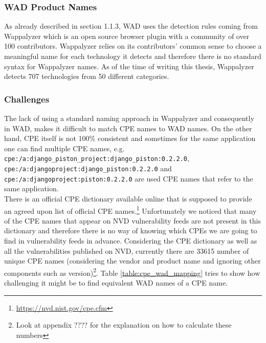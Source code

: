 \subsubsection{WAD Product Names}
As already described in section 1.1.3, WAD uses the detection rules coming from Wappalyzer which is an open source browser plugin with a community of over 100 contributors. Wappalyzer relies on its contributors' common sense to choose a meaningful name for each technology it detects and therefore there is no standard syntax for Wappalyzer names. As of the time of writing this thesis, Wappalyzer detects 707 technologies from 50 different categories.


\subsubsection{Challenges}
The lack of using a standard naming approach in Wappalyzer and consequently in WAD, makes it difficult to match CPE names to WAD names. On the other hand, CPE itself is not 100\% consistent and sometimes for the same application one can find multiple CPE names, e.g. \texttt{cpe:/a:django\_piston\_project:django\_piston:0.2.2.0}, \texttt{cpe:/a:djangoproject:django\_piston:0.2.2.0} and \texttt{cpe:/a:djangoproject:piston:0.2.2.0} are used CPE names that refer to the same application.
\\
There is an official CPE dictionary available online that is supposed to provide an agreed upon list of official CPE names.\footnote{\url{https://nvd.nist.gov/cpe.cfm}} Unfortunately we noticed that many of the CPE names that appear on NVD vulnerability feeds are not present in this dictionary and therefore there is no way of knowing which CPEs we are going to find in vulnerability feeds in advance. Considering the CPE dictionary as well as all the vulnerabilities published on NVD, currently there are 33615 number of unique CPE names (considering the vendor and product name and ignoring other components such as version)\footnote{Look at appendix ???? for the explanation on how to calculate these numbers}. Table \ref{table:cpe_wad_mapping} tries to show how challenging it might be to find equivalent WAD names of a CPE name.

